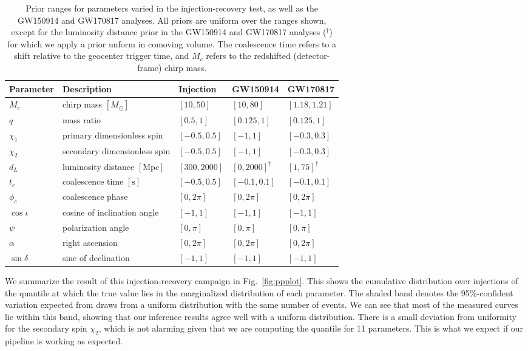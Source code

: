\documentclass[twocolumn]{aastex631}
\begin{document}
\begin{table*}[hbt!]
    \begin{center}
    \begin{tabular}{ l l l l l }
    \hline
    \hline
    Parameter &  Description & Injection & GW150914 & GW170817\\
    \hline

    $M_c$ & chirp mass $[M_\odot]$& $[10, 50]$ & $[10,80]$ & $[1.18,1.21]$ \\
    $q$ & mass ratio & $[0.5, 1]$ & $[0.125,1]$ & $[0.125,1]$ \\
    $\chi_1$ & primary dimensionless spin& $[-0.5, 0.5]$ & $[-1,1]$ & $[-0.3,0.3]$ \\
    $\chi_2$ & secondary dimensionless spin & $[-0.5, 0.5]$ & $[-1,1]$ & $[-0.3,0.3]$ \\
    $d_L$ & luminosity distance $[\textrm{Mpc}]$ & $[300, 2000]$ & $[0, 2000]^\dag$ & $[1, 75]^\dag$ \\
    $t_c$ & coalescence time $[\textrm{s}]$& $[-0.5, 0.5]$ & $[-0.1, 0.1]$ & $[-0.1, 0.1]$ \\
    $\phi_c$ & coalescence phase & $[0, 2\pi]$ & $[0, 2\pi]$ & $[0, 2\pi]$ \\
    $\cos{\iota}$ & cosine of inclination angle & $[-1, 1]$ & $[-1, 1]$ & $[-1, 1]$ \\
    $\psi$ & polarization angle & $[0, \pi]$ & $[0, \pi]$ & $[0, \pi]$ \\
    $\alpha$ & right ascension & $[0, 2\pi]$ & $[0, 2\pi]$ & $[0, 2\pi]$ \\
    $\sin{\delta}$ & sine of declination & $[-1, 1]$ & $[-1, 1]$ & $[-1, 1]$ \\

    \hline
    \hline
    \end{tabular}
    \caption{Prior ranges for parameters varied in the injection-recovery test,
    as well as the GW150914 and GW170817 analyses. All priors are uniform over
    the ranges shown, except for the luminosity distance prior in the GW150914
    and GW170817 analyses ($^\dag$) for which we apply a prior unform in
    comoving volume. The coalescence time refers to a shift relative to the
    geocenter trigger time, and $M_c$ refers to the redshifted (detector-frame)
    chirp mass.}
    \label{tab:parameters}
    \end{center}
\end{table*}

We summarize the result of this injection-recovery campaign in
Fig.~\ref{fig:ppplot}. This shows the cumulative distribution over injections
of the quantile at which the true value lies in the marginalized distribution
of each parameter. The shaded band denotes the 95\%-confident variation
expected from draws from a uniform distribution with the same number of events.
We can see that most of the measured curves lie within this band, showing that
our inference results agree well with a uniform distribution. There is a small
deviation from uniformity for the secondary spin $\chi_2$, which is
not alarming given that we are computing the quantile for 11 parameters.  This
is what we expect if our pipeline is working as expected.
\end{document}
